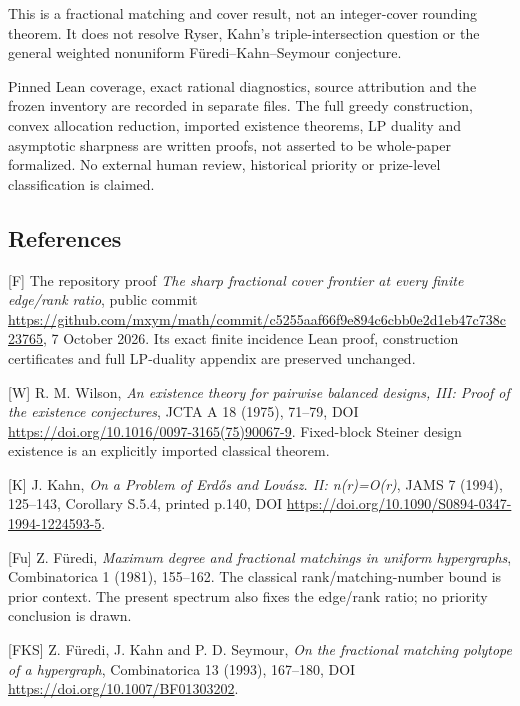 \documentclass[
  11pt,
]{article}
\begin{document}
This is a fractional matching and cover result, not an integer-cover
rounding theorem. It does not resolve Ryser, Kahn's triple-intersection
question or the general weighted nonuniform Füredi--Kahn--Seymour
conjecture.

Pinned Lean coverage, exact rational diagnostics, source attribution and
the frozen inventory are recorded in separate files. The full greedy
construction, convex allocation reduction, imported existence theorems,
LP duality and asymptotic sharpness are written proofs, not asserted to
be whole-paper formalized. No external human review, historical priority
or prize-level classification is claimed.

\subsection{References}\label{references}

{[}F{]} The repository proof \emph{The sharp fractional cover frontier
at every finite edge/rank ratio}, public commit
\url{https://github.com/mxym/math/commit/c5255aaf66f9e894c6cbb0e2d1eb47c738c23765},
7 October 2026. Its exact finite incidence Lean proof, construction
certificates and full LP-duality appendix are preserved unchanged.

{[}W{]} R. M. Wilson, \emph{An existence theory for pairwise balanced
designs, III: Proof of the existence conjectures}, JCTA A 18 (1975),
71--79, DOI \url{https://doi.org/10.1016/0097-3165(75)90067-9}.
Fixed-block Steiner design existence is an explicitly imported classical
theorem.

{[}K{]} J. Kahn, \emph{On a Problem of Erdős and Lovász. II: n(r)=O(r)},
JAMS 7 (1994), 125--143, Corollary S.5.4, printed p.140, DOI
\url{https://doi.org/10.1090/S0894-0347-1994-1224593-5}.

{[}Fu{]} Z. Füredi, \emph{Maximum degree and fractional matchings in
uniform hypergraphs}, Combinatorica 1 (1981), 155--162. The classical
rank/matching-number bound is prior context. The present spectrum also
fixes the edge/rank ratio; no priority conclusion is drawn.

{[}FKS{]} Z. Füredi, J. Kahn and P. D. Seymour, \emph{On the fractional
matching polytope of a hypergraph}, Combinatorica 13 (1993), 167--180,
DOI \url{https://doi.org/10.1007/BF01303202}.
\end{document}
